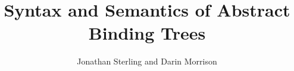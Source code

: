 \documentclass{llncs}
\numberwithin{equation}{section}
\begin{document}
\title{Syntax and Semantics of Abstract Binding Trees}
\date{}
\author{Jonathan Sterling and Darin Morrison}
\institute{}
\maketitle



\appendix
\appendixpage


\ifdraft{}{
  \newpage
  
  
}
\end{document}
